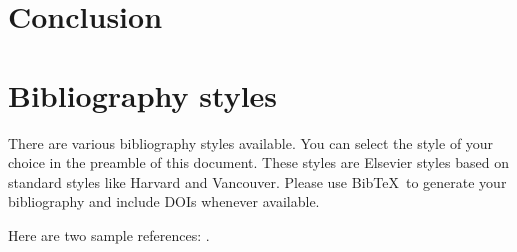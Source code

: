 \documentclass[review]{elsarticle}
\begin{document}
\section{Conclusion}


\section{Bibliography styles}

There are various bibliography styles available. You can select the style of your choice in the preamble of this document. These styles are Elsevier styles based on standard styles like Harvard and Vancouver. Please use Bib\TeX\ to generate your bibliography and include DOIs whenever available.

Here are two sample references: \cite{Feynman1963118,Dirac1953888}.


\end{document}
